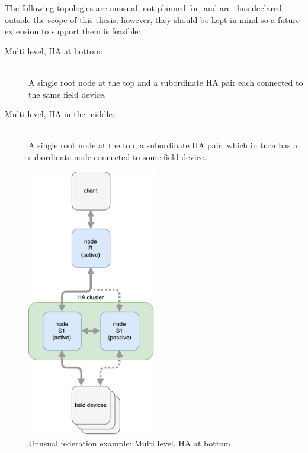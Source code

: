 The following topologies are unusual, not planned for, and are thus declared
outside the scope of this thesis; however, they should be kept in mind so a
future extension to support them is feasible:

\begin{description}
	\item [ Multi level, \gls{HA} at bottom: ] \hfill\\
	A single root node at the top and a subordinate HA pair each connected
	to the same field device.

	\item [ Multi level, \gls{HA} in the middle: ] \hfill\\
	A single root node at the top, a subordinate HA pair, which in turn has
	a subordinate node connected to some field device.
\end{description}

\begin{figure}[]
	\center
	\includegraphics[width=0.5\textwidth]{img/ml_ha_on_sub_exotic_topology.pdf}
	\caption{Unusual federation example: Multi level, \gls{HA} at bottom}
	\label{fig:topo:exotic:ml:ha:on:sub}
\end{figure}

